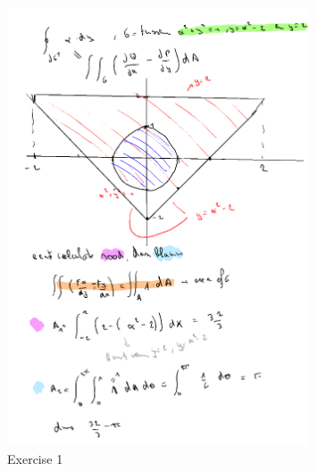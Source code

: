 \documentclass[a4paper]{report}
\begin{document}
\begin{figure}[H]
	\centering
	\includegraphics[width=0.8\textwidth]{assets/bord_7_ex_1_echt.png}
	\caption{Exercise 1}
	\label{fig:bord_7_ex_1_echt}
\end{figure}
\end{document}
